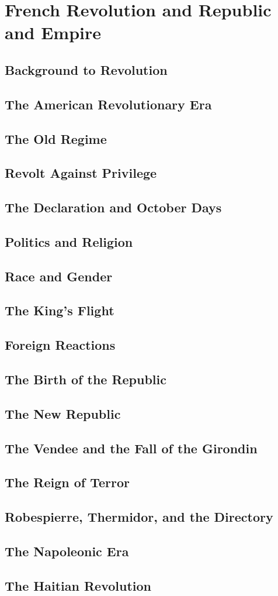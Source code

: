 \documentclass[../euro.tex]{subfiles}
\begin{document}
\chapter{French Revolution and Republic and Empire}
\section{Background to Revolution}
\section{The American Revolutionary Era}
\section{The Old Regime}
\section{Revolt Against Privilege}
\section{The Declaration and October Days}
\section{Politics and Religion}
\section{Race and Gender}
\section{The King's Flight}
\section{Foreign Reactions}
\section{The Birth of the Republic}
\section{The New Republic}
\section{The Vendee and the Fall of the Girondin}
\section{The Reign of Terror}
\section{Robespierre, Thermidor, and the Directory}
\section{The Napoleonic Era}
\section{The Haitian Revolution}
\end{document}
